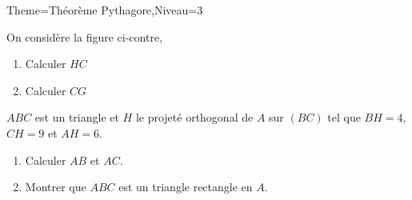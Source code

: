 \documentclass[a4paper,12pt]{article}
\begin{document}
\begin{Maquette}[Fiche]{Theme=Théorème Pythagore,Niveau=3}
\begin{exercice}
\begin{minipage}{.5\linewidth}
On considère la figure ci-contre,
\begin{enumerate}
\item Calculer $HC$
\item Calculer $CG$
\end{enumerate}
\end{minipage}%
\begin{minipage}{.5\linewidth}
\end{minipage}
\end{exercice}

\begin{exercice}
\begin{minipage}{.7\linewidth}
$ABC$ est un triangle et $H$ le projeté orthogonal de $A$ sur $(BC)$ tel que $BH=4$, $CH=9$ et $AH=6$.
\begin{enumerate}
\item Calculer $AB$ et $AC$.
\item Montrer que $ABC$ est un triangle rectangle en $A$.
\end{enumerate}
\end{minipage}%
\begin{minipage}{.3\linewidth}
\end{minipage}
\end{exercice}


\end{Maquette}
\end{document}
